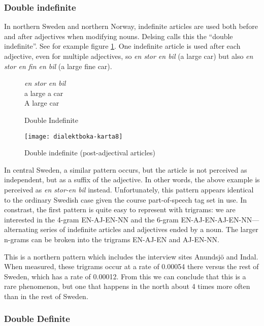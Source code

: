 \subsubsection{Double indefinite}

In northern Sweden and northern Norway, indefinite articles are used both
before and after adjectives when modifying nouns. Delsing calls this
the ``double indefinite''. See for example figure
\ref{double-indefinite-example}. One indefinite article is used after
each adjective, even for multiple adjectives, so {\it en stor en bil}
(a large car) but also {\it en stor en fin en bil} (a large fine car).

\begin{figure}
  {\it en stor en bil} \\
  a large a car \\
  A large car
  \caption{Double Indefinite}
  \label{double-indefinite-example}
\end{figure}

\begin{figure}
  \texttt{[image: dialektboka-karta8]}
  \caption{Double indefinite (post-adjectival articles)}
  \label{double-indefinite-map}
\end{figure}

In central Sweden, a similar pattern occurs, but the article is not
perceived as independent, but as a suffix of the adjective. In other
words, the above example is perceived as {\it en stor-en bil}
instead. Unfortunately, this pattern appears identical to the ordinary
Swedish case given the course part-of-speech tag set in use.
In constrast, the first pattern is quite easy to represent with
trigrams: we are interested in the 4-gram EN-AJ-EN-NN and the 6-gram
EN-AJ-EN-AJ-EN-NN---alternating series of indefinite articles and
adjectives ended by a noun. The larger n-grams can be broken into the
trigrams EN-AJ-EN and AJ-EN-NN.

This is a northern pattern which includes the interview sites
Anundsj\"o and Indal. When measured, these trigrams occur at a rate of
0.00054 there versus the rest of Sweden, which has a rate of
0.00012. From this we can conclude that this is a rare phenomenon, but
one that happens in the north about 4 times more often than in the
rest of Sweden.

\subsubsection{Double Definite}

